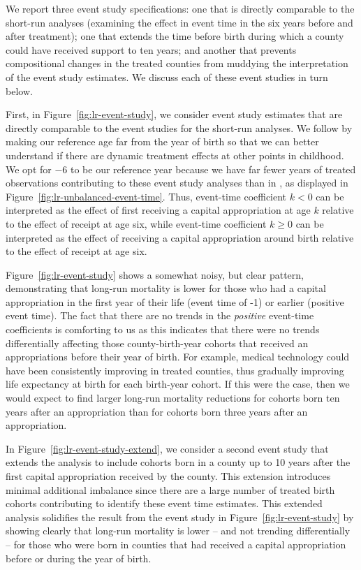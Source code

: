 \documentclass[12pt]{article}
\begin{document}
We report three event study specifications: one that is directly comparable to the short-run analyses (examining the effect in event time in the six years before and after treatment); one that extends the time before birth during which a county could have received support to ten years; and another that prevents compositional changes in the treated counties from muddying the interpretation of the event study estimates. 
We discuss each of these event studies in turn below. 

First, in Figure~\ref{fig:lr-event-study}, we consider event study estimates that are directly comparable to the event studies for the short-run analyses. 
We follow  by making our reference age far from the year of birth so that we can better understand if there are dynamic treatment effects at other points in childhood. 
We opt for $-$6 to be our reference year because we have far fewer years of treated observations contributing to these event study analyses than in , as displayed in Figure~\ref{fig:lr-unbalanced-event-time}. 
Thus, event-time coefficient $k < 0$ can be interpreted as the effect of first receiving a capital appropriation at age $k$ relative to the effect of receipt at age six, while event-time coefficient $k \geq 0$ can be interpreted as the effect of receiving a capital appropriation around birth relative to the effect of receipt at age six. 

Figure~\ref{fig:lr-event-study} shows a somewhat noisy, but clear pattern, demonstrating that long-run mortality is lower for those who had a capital appropriation in the first year of their life (event time of -1) or earlier (positive event time). 
The fact that there are no trends in the \emph{positive} event-time coefficients is comforting to us as this indicates that there were no trends differentially affecting those county-birth-year cohorts that received an appropriations before their year of birth. For example, medical technology could have been consistently improving in treated counties, thus gradually improving life expectancy at birth for each birth-year cohort. If this were the case, then we would expect to find larger long-run mortality reductions for cohorts born ten years after an appropriation than for cohorts born three years after an appropriation. 



In Figure~\ref{fig:lr-event-study-extend}, we consider a second event study that extends the analysis to include cohorts born in a county up to 10 years after the first capital appropriation received by the county. 
This extension introduces minimal additional imbalance since there are a large number of treated birth cohorts contributing to identify these event time estimates. 
This extended analysis solidifies the result from the event study in Figure~\ref{fig:lr-event-study} by showing clearly that long-run mortality is lower -- and not trending differentially -- for those who were born in counties that had received a capital appropriation before or during the year of birth. 
\end{document}

